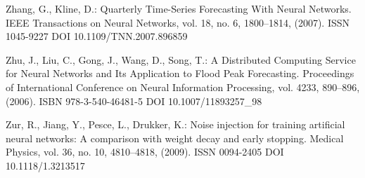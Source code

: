 \begin{thebibliography}{99.}
 Zhang, G., Kline, D.: Quarterly Time-Series Forecasting With Neural Networks. IEEE Transactions on Neural Networks, vol. 18, no. 6, 1800--1814, (2007). ISSN 1045-9227 DOI 10.1109/TNN.2007.896859

 Zhu, J., Liu, C., Gong, J., Wang, D., Song, T.: A Distributed Computing Service for Neural Networks and Its Application to Flood Peak Forecasting. Proceedings of International Conference on Neural Information Processing, vol. 4233, 890--896, (2006). ISBN 978-3-540-46481-5 DOI 10.1007/11893257\_98

 Zur, R., Jiang, Y., Pesce, L., Drukker, K.: Noise injection for training artificial neural networks: A comparison with weight decay and early stopping. Medical Physics, vol. 36, no. 10, 4810--4818, (2009). ISSN 0094-2405 DOI 10.1118/1.3213517

\end{thebibliography}
